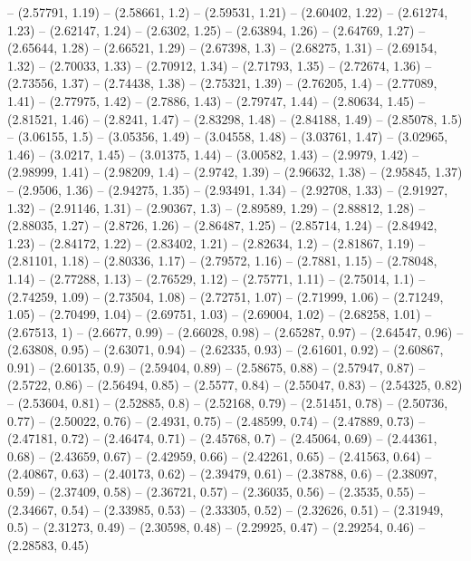 -- (2.57791, 1.19)
-- (2.58661, 1.2)
-- (2.59531, 1.21)
-- (2.60402, 1.22)
-- (2.61274, 1.23)
-- (2.62147, 1.24)
-- (2.6302, 1.25)
-- (2.63894, 1.26)
-- (2.64769, 1.27)
-- (2.65644, 1.28)
-- (2.66521, 1.29)
-- (2.67398, 1.3)
-- (2.68275, 1.31)
-- (2.69154, 1.32)
-- (2.70033, 1.33)
-- (2.70912, 1.34)
-- (2.71793, 1.35)
-- (2.72674, 1.36)
-- (2.73556, 1.37)
-- (2.74438, 1.38)
-- (2.75321, 1.39)
-- (2.76205, 1.4)
-- (2.77089, 1.41)
-- (2.77975, 1.42)
-- (2.7886, 1.43)
-- (2.79747, 1.44)
-- (2.80634, 1.45)
-- (2.81521, 1.46)
-- (2.8241, 1.47)
-- (2.83298, 1.48)
-- (2.84188, 1.49)
-- (2.85078, 1.5)
-- (3.06155, 1.5)
-- (3.05356, 1.49)
-- (3.04558, 1.48)
-- (3.03761, 1.47)
-- (3.02965, 1.46)
-- (3.0217, 1.45)
-- (3.01375, 1.44)
-- (3.00582, 1.43)
-- (2.9979, 1.42)
-- (2.98999, 1.41)
-- (2.98209, 1.4)
-- (2.9742, 1.39)
-- (2.96632, 1.38)
-- (2.95845, 1.37)
-- (2.9506, 1.36)
-- (2.94275, 1.35)
-- (2.93491, 1.34)
-- (2.92708, 1.33)
-- (2.91927, 1.32)
-- (2.91146, 1.31)
-- (2.90367, 1.3)
-- (2.89589, 1.29)
-- (2.88812, 1.28)
-- (2.88035, 1.27)
-- (2.8726, 1.26)
-- (2.86487, 1.25)
-- (2.85714, 1.24)
-- (2.84942, 1.23)
-- (2.84172, 1.22)
-- (2.83402, 1.21)
-- (2.82634, 1.2)
-- (2.81867, 1.19)
-- (2.81101, 1.18)
-- (2.80336, 1.17)
-- (2.79572, 1.16)
-- (2.7881, 1.15)
-- (2.78048, 1.14)
-- (2.77288, 1.13)
-- (2.76529, 1.12)
-- (2.75771, 1.11)
-- (2.75014, 1.1)
-- (2.74259, 1.09)
-- (2.73504, 1.08)
-- (2.72751, 1.07)
-- (2.71999, 1.06)
-- (2.71249, 1.05)
-- (2.70499, 1.04)
-- (2.69751, 1.03)
-- (2.69004, 1.02)
-- (2.68258, 1.01)
-- (2.67513, 1)
-- (2.6677, 0.99)
-- (2.66028, 0.98)
-- (2.65287, 0.97)
-- (2.64547, 0.96)
-- (2.63808, 0.95)
-- (2.63071, 0.94)
-- (2.62335, 0.93)
-- (2.61601, 0.92)
-- (2.60867, 0.91)
-- (2.60135, 0.9)
-- (2.59404, 0.89)
-- (2.58675, 0.88)
-- (2.57947, 0.87)
-- (2.5722, 0.86)
-- (2.56494, 0.85)
-- (2.5577, 0.84)
-- (2.55047, 0.83)
-- (2.54325, 0.82)
-- (2.53604, 0.81)
-- (2.52885, 0.8)
-- (2.52168, 0.79)
-- (2.51451, 0.78)
-- (2.50736, 0.77)
-- (2.50022, 0.76)
-- (2.4931, 0.75)
-- (2.48599, 0.74)
-- (2.47889, 0.73)
-- (2.47181, 0.72)
-- (2.46474, 0.71)
-- (2.45768, 0.7)
-- (2.45064, 0.69)
-- (2.44361, 0.68)
-- (2.43659, 0.67)
-- (2.42959, 0.66)
-- (2.42261, 0.65)
-- (2.41563, 0.64)
-- (2.40867, 0.63)
-- (2.40173, 0.62)
-- (2.39479, 0.61)
-- (2.38788, 0.6)
-- (2.38097, 0.59)
-- (2.37409, 0.58)
-- (2.36721, 0.57)
-- (2.36035, 0.56)
-- (2.3535, 0.55)
-- (2.34667, 0.54)
-- (2.33985, 0.53)
-- (2.33305, 0.52)
-- (2.32626, 0.51)
-- (2.31949, 0.5)
-- (2.31273, 0.49)
-- (2.30598, 0.48)
-- (2.29925, 0.47)
-- (2.29254, 0.46)
-- (2.28583, 0.45)
